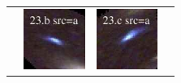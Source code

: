 \documentclass[useAMS,usenatbib]{mn2e}
\begin{document}
\begin{table}
\begin{tabular}{cccc}
    & \multicolumn{1}{m{1.7cm}}{\includegraphics[height=2.00cm,clip]{figs/enfw_img/rgb.pre_23_b_a_tri.ps}}
    & \multicolumn{1}{m{1.7cm}}{\includegraphics[height=2.00cm,clip]{figs/enfw_img/rgb.pre_23_c_a_tri.ps}} \\
  \end{tabular}

\end{table}
\end{document}
